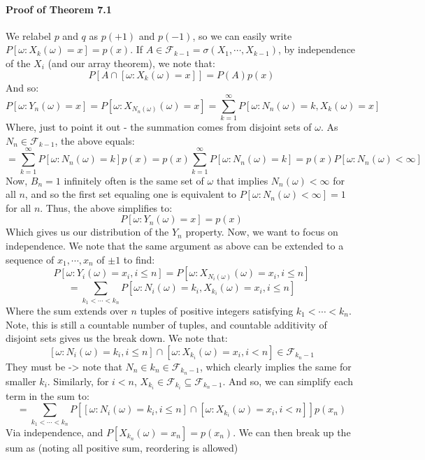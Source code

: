\documentclass[12pt,a4paper]{article}
\newcommand{\1}[1]{\mathbbm{1}\left\{ #1 \right\}}
\newcommand{\fcal}{\mathcal{F}}
\begin{document}
\paragraph{Proof of Theorem 7.1} We relabel $p$ and $q$ as $p(+1)$ and $p(-1)$, so we can easily write $P[\omega: X_k(\omega) = x] = p(x)$. If $A \in \fcal_{k-1} = \sigma(X_1, \cdots, X_{k-1})$, by independence of the $X_i$ (and our array theorem), we note that:
$$
	P\left[A \cap [\omega : X_k(\omega) = x]\right] = P(A)p(x)
$$
And so:
$$
	P\left[\omega: Y_n(\omega) = x\right] =
	P\left[\omega: X_{N_n(\omega)}(\omega) = x\right] =
	\sum_{k=1}^\infty P\left[\omega: N_n(\omega) = k, X_k(\omega) = x\right]
$$
Where, just to point it out - the summation comes from disjoint sets of $\omega$. As $N_n \in \fcal_{k-1}$, the above equals:
$$
	= \sum_{k=1}^\infty P\left[\omega : N_n(\omega) = k\right]p(x) = 
	p(x)\sum_{k=1}^\infty P\left[\omega : N_n(\omega) = k\right] =
	p(x) P\left[\omega: N_n(\omega) < \infty\right]
$$
Now, $B_n = 1$ infinitely often is the same set of $\omega$ that implies $N_n(\omega) < \infty$ for all $n$, and so the first set equaling one is equivalent to $P\left[\omega: N_n(\omega) < \infty\right] = 1$ for all $n$. Thus, the above simplifies to:
$$
	P\left[\omega: Y_n(\omega) = x\right] = p(x)
$$
Which gives us our distribution of the $Y_n$ property. Now, we want to focus on independence. We note that the same argument as above can be extended to a sequence of $x_1, \cdots, x_n$ of $\pm 1$ to find:
$$
	P\left[\omega : Y_i(\omega) = x_i, i \leq n\right] =
	P\left[\omega : X_{N_i(\omega)}(\omega) = x_i, i \leq n\right]
$$
$$
	= \sum_{k_1 < \cdots < k_n} P\left[\omega : N_i(\omega) = k_i, X_{k_i}(\omega) = x_i, i \leq n\right]
$$
Where the sum extends over $n$ tuples of positive integers satisfying $k_1 < \cdots < k_n$. Note, this is still a countable number of tuples, and countable additivity of disjoint sets gives us the break down. We note that:
$$
	\left[\omega : N_i(\omega) = k_i, i \leq n\right] \cap 
	\left[\omega: X_{k_i}(\omega) = x_i, i < n\right] \in \fcal_{k_n - 1}
$$
They must be -> note that $N_n \in k_n \in \fcal_{k_n - 1}$, which clearly implies the same for smaller $k_i$. Similarly, for $i < n$, $X_{k_i} \in \fcal_{k_i} \subseteq \fcal_{k_n - 1}$. And so, we can simplify each term in the sum to:
$$
	= \sum_{k_1 < \cdots < k_n} 
	P\left[\left[\omega : N_i(\omega) = k_i, i \leq n\right] \cap 
	\left[\omega: X_{k_i}(\omega) = x_i, i < n\right]\right] p(x_n)
$$
Via independence, and $P[X_{k_n}(\omega) = x_n] = p(x_n)$. We can then break up the sum as (noting all positive sum, reordering is allowed)
\end{document}
